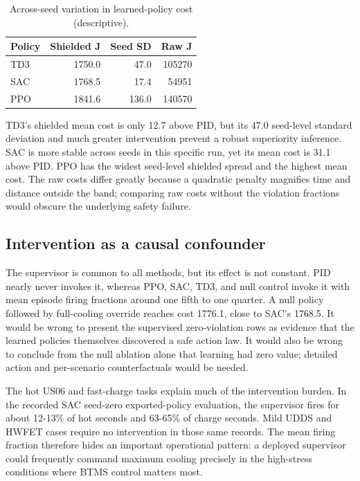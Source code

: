 \documentclass[conference]{IEEEtran}
\begin{document}
\begin{table}[t]
\caption{Across-seed variation in learned-policy cost (descriptive).}
\label{tab:X}
\centering\footnotesize
\begin{tabular}{lrrr}
\toprule
Policy & Shielded J & Seed SD & Raw J\\
\midrule
TD3 & 1750.0 & 47.0 & 105270\\
SAC & 1768.5 & 17.4 & 54951\\
PPO & 1841.6 & 136.0 & 140570\\
\bottomrule
\end{tabular}
\end{table}
TD3's shielded mean cost is only 12.7 above PID, but its 47.0 seed-level standard deviation and much greater intervention prevent a robust superiority inference. SAC is more stable across seeds in this specific run, yet its mean cost is 31.1 above PID. PPO has the widest seed-level shielded spread and the highest mean cost. The raw costs differ greatly because a quadratic penalty magnifies time and distance outside the band; comparing raw costs without the violation fractions would obscure the underlying safety failure.

\subsection{Intervention as a causal confounder}
The supervisor is common to all methods, but its effect is not constant. PID nearly never invokes it, whereas PPO, SAC, TD3, and null control invoke it with mean episode firing fractions around one fifth to one quarter. A null policy followed by full-cooling override reaches cost 1776.1, close to SAC's 1768.5. It would be wrong to present the supervised zero-violation rows as evidence that the learned policies themselves discovered a safe action law. It would also be wrong to conclude from the null ablation alone that learning had zero value; detailed action and per-scenario counterfactuals would be needed.

The hot US06 and fast-charge tasks explain much of the intervention burden. In the recorded SAC seed-zero exported-policy evaluation, the supervisor fires for about 12-13\% of hot seconds and 63-65\% of charge seconds. Mild UDDS and HWFET cases require no intervention in those same records. The mean firing fraction therefore hides an important operational pattern: a deployed supervisor could frequently command maximum cooling precisely in the high-stress conditions where BTMS control matters most.
\end{document}
